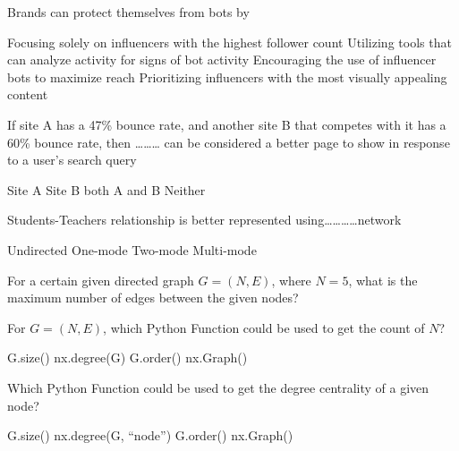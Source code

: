 \documentclass[theme=sleek, randomorder, hidesidemenu]{webquiz}
\begin{document}
\begin{question}
  Brands can protect themselves from bots by
  \begin{choice}[columns=2]
    \incorrect Focusing solely on influencers with the highest follower count
    \correct Utilizing tools that can analyze activity for signs of bot activity
    \incorrect Encouraging the use of influencer bots to maximize reach
    \incorrect Prioritizing influencers with the most visually appealing content
  \end{choice}
\end{question}

\begin{question}
  If site A has a 47\% bounce rate, and another site B that competes with it has a
  60\% bounce rate, then ……… can be considered a better page to show in
  response to a user’s search query
  \begin{choice}[columns=2]
    \correct Site A
    \incorrect Site B
    \incorrect both A and B
    \incorrect Neither
  \end{choice}
\end{question}

\begin{question}
  Students-Teachers relationship is better represented using…………network
  \begin{choice}[columns=2]
    \incorrect Undirected
    \incorrect One-mode
    \correct Two-mode
    \incorrect Multi-mode
  \end{choice}
\end{question}

\begin{question}
  For a certain given directed graph $G = (N, E)$, where $N = 5$, what is the maximum number of edges between the given nodes?
  \begin{choice}
  \end{choice}
\end{question}

\begin{question}
  For $G = (N, E)$, which Python Function could be used to get the count of $N$?
  \begin{choice}[columns=2]
    \incorrect G.size()
    \incorrect nx.degree(G)
    \correct G.order()
    \incorrect nx.Graph()
  \end{choice}
\end{question}

\begin{question}
  Which Python Function could be used to get the degree centrality of a given node?
  \begin{choice}[columns=2]
    \incorrect G.size()
    \correct nx.degree(G, ``node'')
    \incorrect G.order()
    \incorrect nx.Graph()
  \end{choice}
\end{question}
\end{document}
